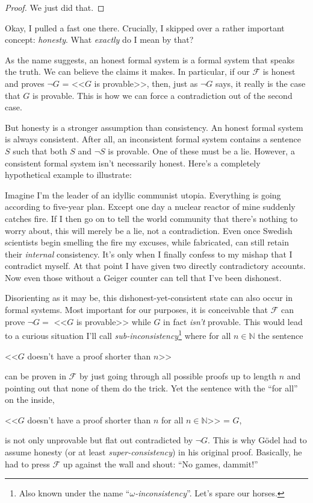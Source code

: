 \documentclass{article}
\theoremstyle{customstyle}
\newcommand{\F}{\ensuremath{\mathcal{F}}}
\begin{document}
\begin{proof}\vspace{-\topsep}
We just did that.
\end{proof}

Okay, I pulled a fast one there. Crucially, I skipped over a rather important concept: \textit{honesty}. What \textit{exactly} do I mean by that?

As the name suggests, an honest formal system is a formal system that speaks the truth. We can believe the claims it makes. In particular, if our $\F$ is honest and proves $\neg G$ = <<$G$ is provable>>, then, just as $\neg G$ says, it really is the case that $G$ is provable. This is how we can force a contradiction out of the second case.

But honesty is a stronger assumption than consistency. An honest formal system is always consistent. After all, an inconsistent formal system contains a sentence $S$ such that both $S$ and $\neg S$ is provable. One of these must be a lie. However, a consistent formal system isn't necessarily honest. Here's a completely hypothetical example to illustrate: 

Imagine I'm the leader of an idyllic communist utopia. Everything is going according to five-year plan. Except one day a nuclear reactor of mine suddenly catches fire. If I then go on to tell the world community that there's nothing to worry about, this will merely be a lie, not a contradiction. Even once Swedish scientists begin smelling the fire my excuses, while fabricated, can still retain their \textit{internal} consistency. It's only when I finally confess to my mishap that I contradict myself. At that point I have given two directly contradictory accounts. Now even those without a Geiger counter can tell that I've been dishonest.

Disorienting as it may be, this dishonest-yet-consistent state can also occur in formal systems. Most important for our purposes, it is conceivable that $\F$ can prove $\neg G =$ <<$G$ is provable>> while $G$ in fact \textit{isn't} provable. This would lead to a curious situation I'll call \textit{sub-inconsistency}\footnote{Also known under the name ``\textit{$\omega$-inconsistency}''. Let's spare our horses.} where for all $n\in\mathbb{N}$ the sentence 
\begin{center}
<<$G$ doesn't have a proof shorter than $n$>>
\end{center}
can be proven in $\F$ by just going through all possible proofs up to length $n$ and pointing out that none of them do the trick. Yet the sentence with the ``for all'' on the inside,
\begin{center}
<<$G$ doesn't have a proof shorter than $n$ for all $n\in\mathbb{N}$>> = $G$,
\end{center}
is not only unprovable but flat out contradicted by $\neg G$. This is why Gödel had to assume honesty (or at least \textit{super-consistency}) in his original proof. Basically, he had to press $\F$ up against the wall and shout: ``No games, dammit!''
\end{document}
